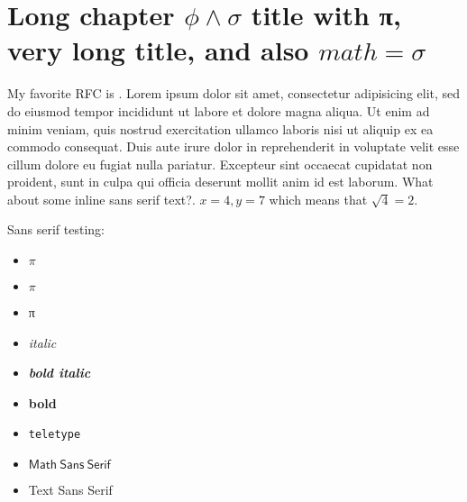 \chapter{Long chapter \texorpdfstring{$\phi \land \sigma$}{phi and sigma} title with π, very long title, and also \texorpdfstring{$math = \sigma$}{math = sigma}}

My favorite RFC is \cite{rfc2549}.
Lorem ipsum dolor sit amet, consectetur adipisicing elit, sed do eiusmod tempor incididunt ut labore et dolore magna aliqua. Ut enim ad minim veniam, quis nostrud exercitation ullamco laboris nisi ut aliquip ex ea commodo consequat. Duis aute irure dolor in reprehenderit in voluptate velit esse cillum dolore eu fugiat nulla pariatur. Excepteur sint occaecat cupidatat non proident, sunt in culpa qui officia deserunt mollit anim id est laborum. \textsf{What about some inline sans serif text?}. $x = 4, y= 7$ which means that $\sqrt{4} = 2$.

Sans serif testing:
\begin{itemize}
    \item \textsf{$\pi$}
    \item \textsf{$π$}
    \item \textsf{π}
    \item \textsf{\emph{italic}}
    \item \textsf{\textbf{\emph{bold italic}}}
    \item \textsf{\textbf{bold}}
    \item \textsf{\texttt{teletype}}
    \item $\mathsf{Math\ Sans\ Serif}$
    \item \textsf{Text Sans Serif}
\end{itemize}

